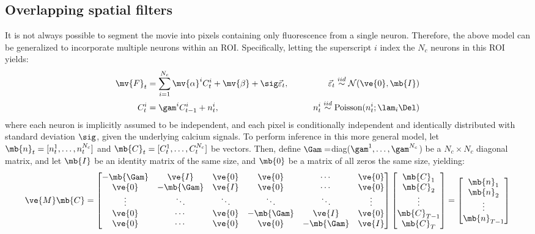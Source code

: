 \subsection{Overlapping spatial filters} \label{sec:methods:overlapping}

It is not always possible to segment the movie into pixels containing only fluorescence from a single neuron.  Therefore, the above model can be generalized to incorporate multiple neurons within an ROI.   Specifically, letting the superscript $i$ index the $N_c$ neurons in this ROI yields:  
\begin{align} \label{eq:overlapping}
\mv{F}_t &= \sum_{i=1}^{N_c}\mv{\alpha}^i C^i_t + \mv{\beta} +  \sig\vec{\varepsilon}_t, \qquad &\vec{\varepsilon}_t \overset{iid}{\sim} \mathcal{N}(\ve{0},\mb{I})   \\
C^i_t &= \gam^i C^i_{t-1} + n^i_t, & n^i_t \overset{iid}{\sim} \text{Poisson}(n^i_t; \lam_i \Del)
\end{align}
\noindent where each neuron is implicitly assumed to be independent, and each pixel is conditionally independent and identically distributed with standard deviation $\sig$, given the underlying calcium signals.  To perform inference in this more general model, let $\mb{n}_t=[n^1_t, \ldots, n^{N_c}_t]$ and $\mb{C}_t=[C^1_t, \ldots, C^{N_c}_t]$ be vectors.  Then, define $\Gam=$diag($\gam^1,\ldots,\gam^{N_c}$) be a $N_c \times N_c$ diagonal matrix, and let $\mb{I}$ be an identity matrix of the same size, and $\mb{0}$ be a matrix of all zeros the same size, yielding:
\begin{align} \label{eq:M2}
\ve{M} \mb{C} = %
\begin{bmatrix}
-\mb{\Gam} & \ve{I} & \ve{0} & \ve{0} & \cdots & \ve{0} \\
\ve{0} & -\mb{\Gam} & \ve{I} & \ve{0} & \cdots  & \ve{0} \\
\vdots & \ddots & \ddots & \ddots & \ddots & \vdots  \\
\ve{0} & \cdots & \ve{0}  & -\mb{\Gam} & \ve{I} & \ve{0} \\
\ve{0} & \cdots & \ve{0} & \ve{0} & -\mb{\Gam} & \ve{I}
\end{bmatrix}
\begin{bmatrix}
\mb{C}_1 \\ \mb{C}_2  \\  \vdots \\ \mb{C}_{T-1} \\ \mb{C}_T  
\end{bmatrix}
= 
\begin{bmatrix}
\mb{n}_1 \\ \mb{n}_2 \\ \vdots \\ \mb{n}_{T-1}
\end{bmatrix}
\end{align}

